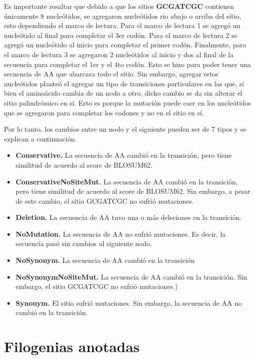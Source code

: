 \documentclass[
]{book}
\begin{document}
Es importante resaltar que debido a que los sitios \textbf{GCGATCGC} contienen únicamente 8 nucleótidos, se agregaron nucleótidos rio abajo o arriba del sitio, esto dependiendo el marco de lectura. Para el marco de lectura 1 se agregó un nucleótido al final para completar el 3er codón. Para el marco de lectura 2 se agregó un nucleótido al inicio para completar el primer codón. Finalmente, para el marco de lectura 3 se agregaron 2 nucleótidos al inicio y dos al final de la secuencia para completar el 1er y el 4to codón. Esto se hizo para poder tener una secuencia de AA que abarcara todo el sitio. Sin embargo, agregar estos nucleótidos planteó el agregar un tipo de transiciones particulares en las que, si bien el aminoácido cambia de un nodo a otro, dicho cambio se da sin alterar el sitio palindrómico en sí. Esto es porque la mutación puede caer en los nucleótidos que se agregaron para completar los codones y no en el sitio en sí.

Por lo tanto, los cambios entre un nodo y el siguiente pueden ser de 7 tipos y se explican a continuación.

\begin{itemize}
\item
  \textbf{Conservative.} La secuencia de AA cambió en la transición, pero tiene similitud de acuerdo al score de BLOSUM62.
\item
  \textbf{ConservativeNoSiteMut.} La secuencia de AA cambió en la transición, pero tiene similitud de acuerdo al score de BLOSUM62. Sin embargo, a pesar de este cambio, el sitio GCGATCGC no sufrió mutaciones.
\item
  \textbf{Deletion.} La secuencia de AA tuvo una o más deleciones en la transición.
\item
  \textbf{NoMutation.} La secuencia de AA no sufrió mutaciones. Es decir, la secuencia pasó sin cambios al siguiente nodo.
\item
  \textbf{NoSynonym.} La secuencia de AA cambió en la transición
\item
  \textbf{NoSynonymNoSiteMut.} La secuencia de AA cambió en la transición. Sin embargo, el sitio GCGATCGC no sufrió mutaciones.)
\item
  \textbf{Synonym.} El sitio sufrió mutaciones. Sin embargo, la secuencia de AA no cambió en la transición.
\end{itemize}

\hypertarget{filogenias-anotadas}{%
\section{Filogenias anotadas}\label{filogenias-anotadas}}
\end{document}
